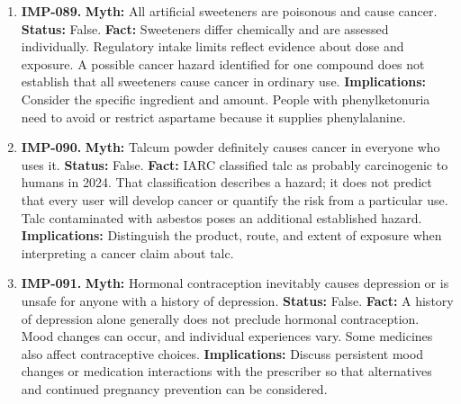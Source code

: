 \documentclass[11pt,oneside]{book}
\begin{document}
\begin{enumerate}[leftmargin=0pt,labelwidth=0pt,labelsep=0pt,itemindent=0pt]
\textbf{Status:} False.\newline
\textbf{Fact:} Time is the main factor in recovery from a hangover. Fluids or food may relieve particular symptoms, but coffee, supplements, and additional alcohol do not reliably end a hangover or restore safe driving ability. \cite{ref27}\newline
\textbf{Implications:} Avoid driving while impaired. Someone who is hard to wake or breathing abnormally after drinking needs emergency care.
\item[] \textbf{IMP-089.} \textbf{Myth:} All artificial sweeteners are poisonous and cause cancer.\newline
\textbf{Status:} False.\newline
\textbf{Fact:} Sweeteners differ chemically and are assessed individually. Regulatory intake limits reflect evidence about dose and exposure. A possible cancer hazard identified for one compound does not establish that all sweeteners cause cancer in ordinary use. \cite{ref28}\newline
\textbf{Implications:} Consider the specific ingredient and amount. People with phenylketonuria need to avoid or restrict aspartame because it supplies phenylalanine.
\item[] \textbf{IMP-090.} \textbf{Myth:} Talcum powder definitely causes cancer in everyone who uses it.\newline
\textbf{Status:} False.\newline
\textbf{Fact:} IARC classified talc as probably carcinogenic to humans in 2024. That classification describes a hazard; it does not predict that every user will develop cancer or quantify the risk from a particular use. Talc contaminated with asbestos poses an additional established hazard. \cite{ref428,ref285}\newline
\textbf{Implications:} Distinguish the product, route, and extent of exposure when interpreting a cancer claim about talc.
\item[] \textbf{IMP-091.} \textbf{Myth:} Hormonal contraception inevitably causes depression or is unsafe for anyone with a history of depression.\newline
\textbf{Status:} False.\newline
\textbf{Fact:} A history of depression alone generally does not preclude hormonal contraception. Mood changes can occur, and individual experiences vary. Some medicines also affect contraceptive choices. \cite{ref429}\newline
\textbf{Implications:} Discuss persistent mood changes or medication interactions with the prescriber so that alternatives and continued pregnancy prevention can be considered.

\end{enumerate}
\end{document}
